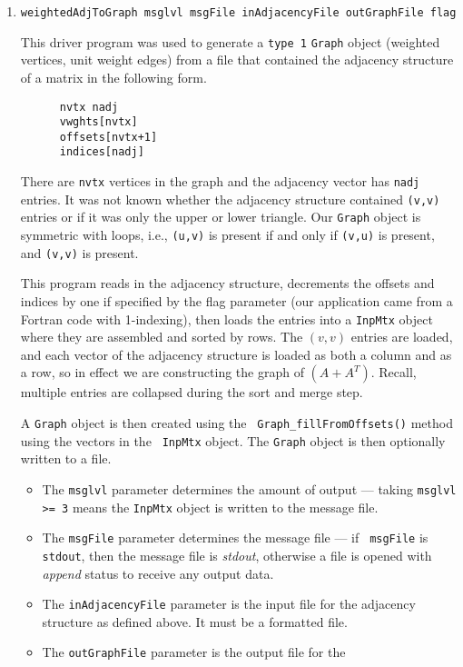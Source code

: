 \begin{enumerate}
\item
\begin{verbatim}
weightedAdjToGraph msglvl msgFile inAdjacencyFile outGraphFile flag
\end{verbatim}
This driver program was used to generate a {\tt type 1} {\tt Graph} 
object (weighted vertices, unit weight edges) from
a file that contained the adjacency structure of a matrix in the
following form.
\begin{verbatim}
      nvtx nadj
      vwghts[nvtx]
      offsets[nvtx+1]
      indices[nadj]
\end{verbatim}
There are {\tt nvtx} vertices in the graph and the adjacency vector
has {\tt nadj} entries.
It was not known whether the adjacency structure contained 
{\tt (v,v)} entries or if it was only the upper or lower triangle.
Our {\tt Graph} object is symmetric with loops, i.e.,
{\tt (u,v)} is present if and only if {\tt (v,u)} is present,
and {\tt (v,v)} is present.
\par
This program reads in the adjacency structure, decrements the
offsets and indices by one if specified by the flag parameter
(our application came from a Fortran code with 1-indexing),
then loads the entries into a {\tt InpMtx} object where they are
assembled and sorted by rows.
The $(v,v)$ entries are loaded, and each vector of the adjacency
structure is loaded as both a column and as a row, so in effect we
are constructing the graph of $(A+A^T)$.
Recall, multiple entries are collapsed during the sort and merge
step.
\par
A {\tt Graph} object is then created using the {\tt
Graph\_fillFromOffsets()} method using the vectors in the {\tt
InpMtx} object.
The {\tt Graph} object is then optionally written to a file.
\par
\begin{itemize}
\item
The {\tt msglvl} parameter determines the amount of output ---
taking {\tt msglvl >= 3} means the {\tt InpMtx} object is written
to the message file.
\item
The {\tt msgFile} parameter determines the message file --- if {\tt
msgFile} is {\tt stdout}, then the message file is {\it stdout},
otherwise a file is opened with {\it append} status to receive any
output data.
\item
The {\tt inAdjacencyFile} parameter is the input file for the 
adjacency structure as defined above.
It must be a formatted file.
\item
The {\tt outGraphFile} parameter is the output file for the 

\end{itemize}
\end{enumerate}
